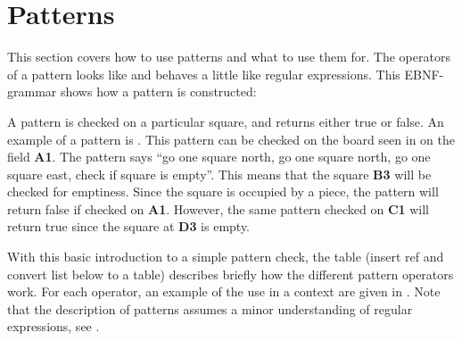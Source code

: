 \section{Patterns}
\label{sec:patterns}

This section covers how to use patterns and what to use them for. The operators of a pattern looks like and behaves a little like regular expressions. This EBNF-grammar shows how a pattern is constructed:

\begin{ebnf}
\end{ebnf}


A pattern is checked on a particular square, and returns either true or false. An example of a pattern is . This pattern can be checked on the board seen in  on the field \textbf{A1}. The pattern says ``go one square north, go one square north, go one square east, check if square is empty''. This means that the square \textbf{B3} will be checked for emptiness. Since the square is occupied by a piece, the pattern will return false if checked on \textbf{A1}. However, the same pattern checked on \textbf{C1} will return true since the square at \textbf{D3} is empty.

With this basic introduction to a simple pattern check, the table (insert ref and convert list below to a table) describes briefly how the different pattern operators work. For each operator, an example of the use in a context are given in . Note that the description of patterns assumes a minor understanding of regular expressions, see \cite{regex}.

